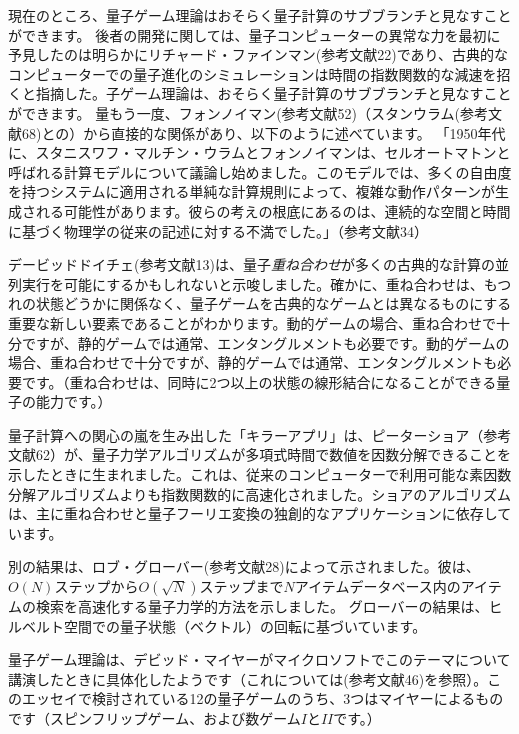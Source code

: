 現在のところ、量子ゲーム理論はおそらく量子計算のサブブランチと見なすことができます。
後者の開発に関しては、量子コンピューターの異常な力を最初に予見したのは明らかにリチャード・ファインマン(参考文献22)であり、古典的なコンピューターでの量子進化のシミュレーションは時間の指数関数的な減速を招くと指摘した。子ゲーム理論は、おそらく量子計算のサブブランチと見なすことができます。
 量もう一度、フォンノイマン(参考文献52)（スタンウラム(参考文献68)との）から直接的な関係があり、以下のように述べています。
 「1950年代に、スタニスワフ・マルチン・ウラムとフォンノイマンは、セルオートマトンと呼ばれる計算モデルについて議論し始めました。このモデルでは、多くの自由度を持つシステムに適用される単純な計算規則によって、複雑な動作パターンが生成される可能性があります。彼らの考えの根底にあるのは、連続的な空間と時間に基づく物理学の従来の記述に対する不満でした。」（参考文献34）
 
デービッドドイチェ(参考文献13)は、量子\textit{重ね合わせ}が多くの古典的な計算の並列実行を可能にするかもしれないと示唆しました。確かに、重ね合わせは、もつれの状態どうかに関係なく、量子ゲームを古典的なゲームとは異なるものにする重要な新しい要素であることがわかります。動的ゲームの場合、重ね合わせで十分ですが、静的ゲームでは通常、エンタングルメントも必要です。動的ゲームの場合、重ね合わせで十分ですが、静的ゲームでは通常、エンタングルメントも必要です。（重ね合わせは、同時に2つ以上の状態の線形結合になることができる量子の能力です。）

量子計算への関心の嵐を生み出した「キラーアプリ」は、ピーターショア（参考文献62）が、量子力学アルゴリズムが多項式時間で数値を因数分解できることを示したときに生まれました。これは、従来のコンピューターで利用可能な素因数分解アルゴリズムよりも指数関数的に高速化されました。ショアのアルゴリズムは、主に重ね合わせと量子フーリエ変換の独創的なアプリケーションに依存しています。

別の結果は、ロブ・グローバー(参考文献28)によって示されました。彼は、$O(N)$ステップから$O(\sqrt{N})$ステップまで$N$アイテムデータベース内のアイテムの検索を高速化する量子力学的方法を示しました。 グローバーの結果は、ヒルベルト空間での量子状態（ベクトル）の回転に基づいています。

量子ゲーム理論は、デビッド・マイヤーがマイクロソフトでこのテーマについて講演したときに具体化したようです（これについては(参考文献46)を参照）。このエッセイで検討されている12の量子ゲームのうち、3つはマイヤーによるものです（スピンフリップゲーム、および数ゲーム$I$と$II$です。）

